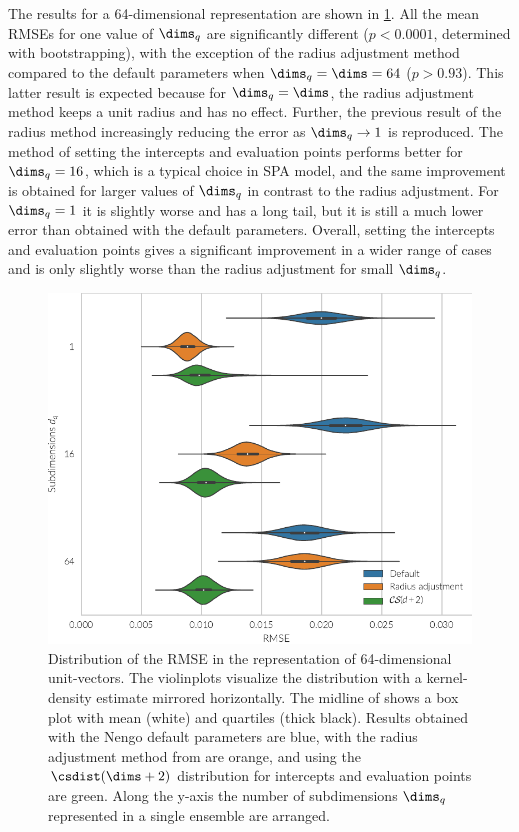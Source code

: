 The results for a 64-dimensional representation are shown in \cref{fig:spaopt-repr}.
All the mean RMSEs for one value of $\dims_q$ are significantly different ($p < 0.0001$,
determined with bootstrapping), with the exception of the radius adjustment method compared to the default parameters when $\dims_q = \dims = 64$ ($p > 0.93$).
This latter result is expected because for $\dims_q = \dims$, the radius adjustment method keeps a unit radius and has no effect.
Further, the previous result of the radius method increasingly reducing the error as $\dims_q \rightarrow 1$ is reproduced.
The method of setting the intercepts and evaluation points performs better for $\dims_q = 16$, which is a typical choice in SPA model, and the same improvement is obtained for larger values of $\dims_q$ in contrast to the radius adjustment.
For $\dims_q = 1$ it is slightly worse and has a long tail, but it is still a much lower error than obtained with the default parameters.
Overall, setting the intercepts and evaluation points gives a significant improvement in a wider range of cases and is only slightly worse than the radius adjustment for small $\dims_q$.
\begin{figure}
    \centering
    \includegraphics{figures/spaopt-repr}
    \caption[Distribution of the RMSE in the representation of unit-vectors]{Distribution of the RMSE in the representation of 64-dimensional unit-vectors. The violinplots visualize the distribution with a kernel-density estimate mirrored horizontally. The midline of shows a box plot with mean (white) and quartiles (thick black). Results obtained with the Nengo default parameters are blue, with the radius adjustment method from \textcite{gosmann216} are orange, and using the $\csdist(\dims + 2)$ distribution for intercepts and evaluation points are green. Along the y-axis the number of subdimensions $\dims_q$ represented in a single ensemble are arranged.}\label{fig:spaopt-repr}
\end{figure}


